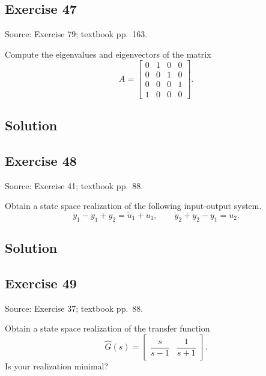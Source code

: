 \documentclass[12pt,a4paper]{article}
\newlength{\questionroom}
\newenvironment{questionprompt}{%
  \begin{lrbox}{\questionbox}\begin{minipage}{\linewidth}%
}{%
  \end{minipage}\end{lrbox}%
  \setlength{\questionroom}{\dimexpr\ht\questionbox+\dp\questionbox+5.2cm\relax}%
  \ifdim\questionroom>\textheight\setlength{\questionroom}{\textheight}\fi
  \Needspace{\questionroom}%
  \noindent\usebox{\questionbox}\par
}
\begin{document}
\begin{questionprompt}
\section*{Exercise 47}
\label{practice:47}
{\small Source: Exercise 79; textbook pp.~163.}\par
Compute the eigenvalues and eigenvectors of the matrix
\[A=\begin{bmatrix}0&1&0&0\\0&0&1&0\\0&0&0&1\\1&0&0&0\end{bmatrix}.\]
\end{questionprompt}
\subsection*{Solution}
\vspace{3.5cm}


\begin{questionprompt}
\section*{Exercise 48}
\label{practice:48}
{\small Source: Exercise 41; textbook pp.~88.}\par
Obtain a state space realization of the following input-output system.
\[\ddot y_1-y_1+y_2=\dot u_1+u_1,\qquad\ddot y_2+y_2-y_1=u_2.\]
\end{questionprompt}
\subsection*{Solution}
\vspace{3.5cm}


\begin{questionprompt}
\section*{Exercise 49}
\label{practice:49}
{\small Source: Exercise 37; textbook pp.~88.}\par
Obtain a state space realization of the transfer function
\[\widehat G(s)=\begin{bmatrix}\dfrac{s}{s-1}&\dfrac{1}{s+1}\end{bmatrix}.\]
Is your realization minimal?
\end{questionprompt}
\end{document}

